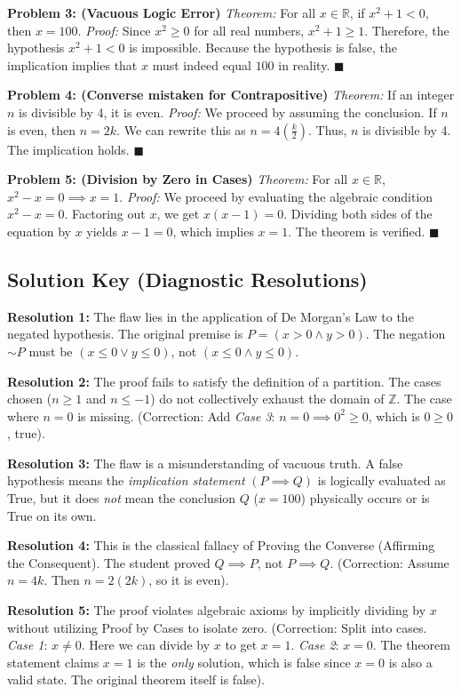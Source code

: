 \documentclass[11pt]{article}
\begin{document}
\textbf{Problem 3: (Vacuous Logic Error)}
\textit{Theorem:} For all $x \in \mathbb{R}$, if $x^2 + 1 < 0$, then $x = 100$.
\textit{Proof:} Since $x^2 \ge 0$ for all real numbers, $x^2 + 1 \ge 1$. Therefore, the hypothesis $x^2 + 1 < 0$ is impossible. Because the hypothesis is false, the implication implies that $x$ must indeed equal $100$ in reality. $\blacksquare$

\textbf{Problem 4: (Converse mistaken for Contrapositive)}
\textit{Theorem:} If an integer $n$ is divisible by 4, it is even.
\textit{Proof:} We proceed by assuming the conclusion. If $n$ is even, then $n = 2k$. We can rewrite this as $n = 4(\frac{k}{2})$. Thus, $n$ is divisible by 4. The implication holds. $\blacksquare$

\textbf{Problem 5: (Division by Zero in Cases)}
\textit{Theorem:} For all $x \in \mathbb{R}$, $x^2 - x = 0 \implies x = 1$.
\textit{Proof:} We proceed by evaluating the algebraic condition $x^2 - x = 0$. Factoring out $x$, we get $x(x - 1) = 0$. Dividing both sides of the equation by $x$ yields $x - 1 = 0$, which implies $x = 1$. The theorem is verified. $\blacksquare$

\newpage
\subsection{Solution Key (Diagnostic Resolutions)}

\textbf{Resolution 1:} The flaw lies in the application of De Morgan's Law to the negated hypothesis. The original premise is $P = (x > 0 \land y > 0)$. The negation $\sim P$ must be $(x \le 0 \lor y \le 0)$, not $(x \le 0 \land y \le 0)$. 

\textbf{Resolution 2:} The proof fails to satisfy the definition of a partition. The cases chosen ($n \ge 1$ and $n \le -1$) do not collectively exhaust the domain of $\mathbb{Z}$. The case where $n = 0$ is missing. (Correction: Add \textit{Case 3}: $n = 0 \implies 0^2 \ge 0$, which is $0 \ge 0$, true).

\textbf{Resolution 3:} The flaw is a misunderstanding of vacuous truth. A false hypothesis means the \textit{implication statement} $(P \implies Q)$ is logically evaluated as True, but it does \textit{not} mean the conclusion $Q$ ($x=100$) physically occurs or is True on its own. 

\textbf{Resolution 4:} This is the classical fallacy of Proving the Converse (Affirming the Consequent). The student proved $Q \implies P$, not $P \implies Q$. (Correction: Assume $n = 4k$. Then $n = 2(2k)$, so it is even).

\textbf{Resolution 5:} The proof violates algebraic axioms by implicitly dividing by $x$ without utilizing Proof by Cases to isolate zero. (Correction: Split into cases. \textit{Case 1}: $x \neq 0$. Here we can divide by $x$ to get $x = 1$. \textit{Case 2}: $x = 0$. The theorem statement claims $x=1$ is the \textit{only} solution, which is false since $x=0$ is also a valid state. The original theorem itself is false).
\end{document}
